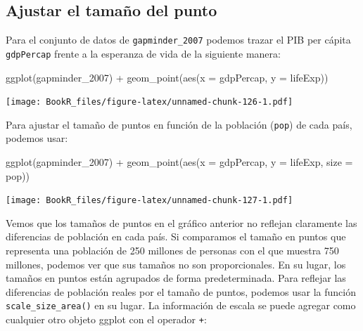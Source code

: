 \documentclass[
]{book}
\newenvironment{Shaded}{\begin{snugshade}}{\end{snugshade}}
\newcommand{\AttributeTok}[1]{\textcolor[rgb]{0.77,0.63,0.00}{#1}}
\newcommand{\FunctionTok}[1]{\textcolor[rgb]{0.00,0.00,0.00}{#1}}
\newcommand{\NormalTok}[1]{#1}
\newcommand{\SpecialCharTok}[1]{\textcolor[rgb]{0.00,0.00,0.00}{#1}}
\begin{document}
\hypertarget{ajustar-el-tamauxf1o-del-punto}{%
\subsection{Ajustar el tamaño del punto}\label{ajustar-el-tamauxf1o-del-punto}}

Para el conjunto de datos de \texttt{gapminder\_2007} podemos trazar el PIB per cápita \texttt{gdpPercap} frente a la esperanza de vida de la siguiente manera:

\begin{Shaded}
\begin{Highlighting}[]
\FunctionTok{ggplot}\NormalTok{(gapminder\_2007) }\SpecialCharTok{+} 
  \FunctionTok{geom\_point}\NormalTok{(}\FunctionTok{aes}\NormalTok{(}\AttributeTok{x =}\NormalTok{ gdpPercap, }
                 \AttributeTok{y =}\NormalTok{ lifeExp))}
\end{Highlighting}
\end{Shaded}

\texttt{[image: BookR\_files/figure-latex/unnamed-chunk-126-1.pdf]}

Para ajustar el tamaño de puntos en función de la población (\texttt{pop}) de cada país, podemos usar:

\begin{Shaded}
\begin{Highlighting}[]
\FunctionTok{ggplot}\NormalTok{(gapminder\_2007) }\SpecialCharTok{+} 
  \FunctionTok{geom\_point}\NormalTok{(}\FunctionTok{aes}\NormalTok{(}\AttributeTok{x =}\NormalTok{ gdpPercap, }\AttributeTok{y =}\NormalTok{ lifeExp,}
                 \AttributeTok{size =}\NormalTok{ pop))}
\end{Highlighting}
\end{Shaded}

\texttt{[image: BookR\_files/figure-latex/unnamed-chunk-127-1.pdf]}

Vemos que los tamaños de puntos en el gráfico anterior no reflejan claramente las diferencias de población en cada país. Si comparamos el tamaño en puntos que representa una población de 250 millones de personas con el que muestra 750 millones, podemos ver que sus tamaños no son proporcionales. En su lugar, los tamaños en puntos están agrupados de forma predeterminada. Para reflejar las diferencias de población reales por el tamaño de puntos, podemos usar la función \texttt{scale\_size\_area()} en su lugar. La información de escala se puede agregar como cualquier otro objeto ggplot con el operador \texttt{+}:
\end{document}
